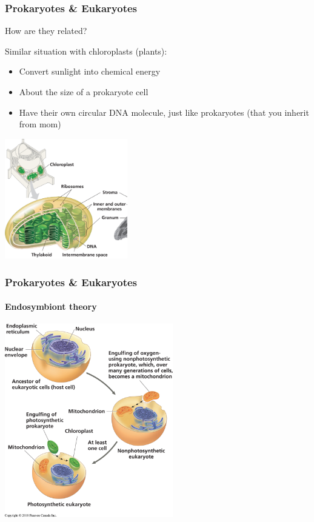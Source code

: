 \documentclass[10pt]{beamer}
\begin{document}
\begin{frame}[t]
\frametitle{Prokaryotes \& Eukaryotes}
\vspace{0.25cm}

	\begin{center}
		\textcolor{myblue}{How are they related?}
	\end{center}

	\vspace{0.25cm}
	
	Similar situation with chloroplasts (plants):
		\medskip
		\begin{itemize}
			\item Convert sunlight into chemical energy
			\medskip
			\item About the size of a prokaryote cell
			\medskip
			\item Have their own circular DNA molecule, just like prokaryotes (that you inherit from mom)
		\end{itemize}	
	
	\begin{center}
		\includegraphics[width=0.4\textwidth]{figures/fg06_18.jpg}
	\end{center}	
\end{frame}


\begin{frame}
\frametitle{Prokaryotes \& Eukaryotes}
\framesubtitle{Endosymbiont theory}
	\begin{center}
		\includegraphics[width=0.55\textwidth]{figures/fg06_16.jpg}
	\end{center}	
\end{frame}
\end{document}
